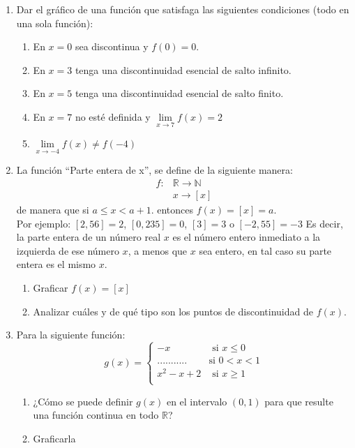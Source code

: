 \documentclass[12pt]{article}
\theoremstyle{definition}
\begin{document}
\begin{enumerate}
\item  Dar el gráfico de una función que satisfaga las siguientes condiciones (todo en una sola función):
\begin{enumerate}
\item  En $x = 0$  sea discontinua y $f(0) = 0$.
\item  En $ x = 3$ tenga una discontinuidad esencial de salto infinito.
\item  En $x = 5$  tenga una discontinuidad esencial de salto finito.
\item  En $x = 7$ no esté definida y  $\lim \limits_{x \to 7} f(x) = 2$ 
\item  $\lim \limits_{x \to -4} f(x) \neq f(-4)$ 
\end{enumerate}

\item La función “Parte entera de x”, se define de la siguiente manera:
\begin{align*}
f:& \mathbb{R} \to \mathbb{N}\\
& x \to [x]
\end{align*}
\noindent
de manera que si $a \leq x < a+1$. entonces $f(x) = [x]=a$. \\
Por ejemplo: $[2,56] = 2$, $[0,235] = 0$, $[3] = 3$  o $[-2,55] = -3$  Es decir, la parte entera de un número real $x$ es el número entero inmediato a la izquierda de ese número $x$, a menos que $x$ sea entero, en tal caso su parte entera es el mismo $x$.
\begin{enumerate}
\item Graficar $f(x) = [x]$
\item  Analizar cuáles y de qué tipo son los puntos de discontinuidad de $f(x)$.
\end{enumerate}

\item Para la siguiente función:
\begin{equation*}
g(x) = %
\begin{cases} 
 -x & \text{  si   } x \leq 0 \\
\text{...........} & \text{si  }  0 < x < 1\\
x^2-x+2 & \text{  si   } x \geq 1 \\
\end{cases} %
\end{equation*}
\begin{enumerate}
\item ¿Cómo se puede definir $g(x)$ en el intervalo $(0,1)$ para que resulte una función continua en todo   $\mathbb{R}$?
\item  Graficarla
\end{enumerate}



\end{enumerate}
\end{document}
